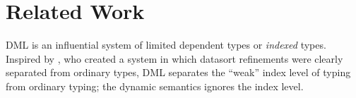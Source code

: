 \documentclass{purple}
\begin{document}
%
%





\section{Related Work}
\label{sec:relatedwork}

DML \citep{Xi99popl,Xi07} is an influential system of limited dependent types
or \emph{indexed} types.  Inspired by \citet{Freeman91},
who created a system in which datasort refinements were clearly separated from ordinary types,
DML separates the ``weak'' index level of typing from ordinary typing;
the dynamic semantics ignores the index level.
\end{document}
